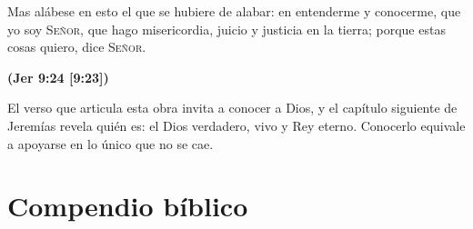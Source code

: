 \documentclass[11pt,letterpaper]{article}
\newcommand{\SENOR}{\textsc{Señor}}
\newcommand{\fuente}[1]{\par\hfill{\upshape\bfseries\small\textcolor{azul}{#1}}}
\begin{document}
\begin{cita}Mas alábese en esto el que se hubiere de alabar: en entenderme y conocerme, que yo soy \SENOR{}, que hago misericordia, juicio y justicia en la tierra; porque estas cosas quiero, dice \SENOR{}.\fuente{(Jer 9:24 [9:23])}\end{cita}

El verso que articula esta obra invita a conocer a Dios, y el capítulo siguiente de Jeremías revela quién es: el Dios verdadero, vivo y Rey eterno. Conocerlo equivale a apoyarse en lo único que no se cae.

\section*{Compendio bíblico}
\end{document}
